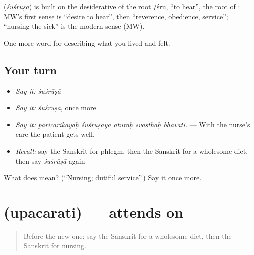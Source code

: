 \begin{cousinweb}
\textbf{} (\emph{śuśrūṣā}) is built on the desiderative of the root √śru, \textquotedblleft{}to hear\textquotedblright{}, the root of \textbf{}: MW's first sense is \textquotedblleft{}desire to hear\textquotedblright{}, then \textquotedblleft{}reverence, obedience, service\textquotedblright{}; \textquotedblleft{}nursing the sick\textquotedblright{} is the modern sense (MW).
\end{cousinweb}

\begin{grammarlens}[title={What you've built}]
One more word for describing what you lived and felt.
\end{grammarlens}

\subsection*{Your turn}
\begin{itemize}
\raggedright
  \item \emph{Say it:} \emph{śuśrūṣā}
  \item \emph{Say it:} \emph{śuśrūṣā}, once more
  \item \emph{Say it:} \emph{paricārikāyāḥ śuśrūṣayā āturaḥ svasthaḥ bhavati.} — With the nurse's care the patient gets well.
  \item \emph{Recall:} say the Sanskrit for phlegm, then the Sanskrit for a wholesome diet, then say \emph{śuśrūṣā} again
\end{itemize}

\begin{tcolorbox}[breakable,colback=teal!4,colframe=teal!35!black,title={Before you move on}]
What does  mean? (\textquotedblleft{}Nursing; dutiful service\textquotedblright{}.) Say it once more.
\end{tcolorbox}
\section[\texorpdfstring{\sk{उपचरति} (upacarati)}{उपचरति (upacarati)}]{ (upacarati) — attends on}

\label{lesson:SA-C485-upacarati}



\begin{quote}
Before the new one: say the Sanskrit for a wholesome diet, then the Sanskrit for nursing.
\end{quote}

